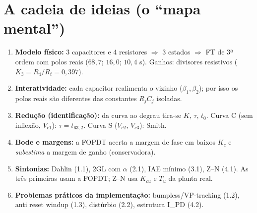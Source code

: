 \documentclass[11pt,a4paper]{article}
\newcommand{\Vc}[1]{V_{c#1}}
\begin{document}
\section{A cadeia de ideias (o ``mapa mental'')}\label{cadeia}
\begin{enumerate}
\item \textbf{Modelo físico:} 3 capacitores e 4 resistores $\Rightarrow$ 3 estados $\Rightarrow$ FT de 3ª ordem com polos reais ($68{,}7$; $16{,}0$; $10{,}4$ s). Ganhos: divisores resistivos ($K_3=R_4/R_t=0{,}397$).
\item \textbf{Interatividade:} cada capacitor realimenta o vizinho ($\beta_1,\beta_2$); por isso os polos reais são diferentes das constantes $R_jC_j$ isoladas.
\item \textbf{Redução (identificação):} da curva ao degrau tira-se $K$, $\tau$, $t_0$. Curva C (sem inflexão, $\Vc1$): $\tau=t_{63,2}$. Curva S ($\Vc2$, $\Vc3$): Smith.
\item \textbf{Bode e margens:} a FOPDT acerta a margem de fase em baixos $K_c$ e \emph{subestima} a margem de ganho (conservadora).
\item \textbf{Sintonias:} Dahlin (1.1), 2GL com $\alpha$ (2.1), IAE mínimo (3.1), Z--N (4.1). As três primeiras usam a FOPDT; Z--N usa $K_{cu}$ e $T_u$ da planta real.
\item \textbf{Problemas práticos da implementação:} bumpless/VP-tracking (1.2), anti reset windup (1.3), distúrbio (2.2), estrutura I\_PD (4.2).
\end{enumerate}
\end{document}
